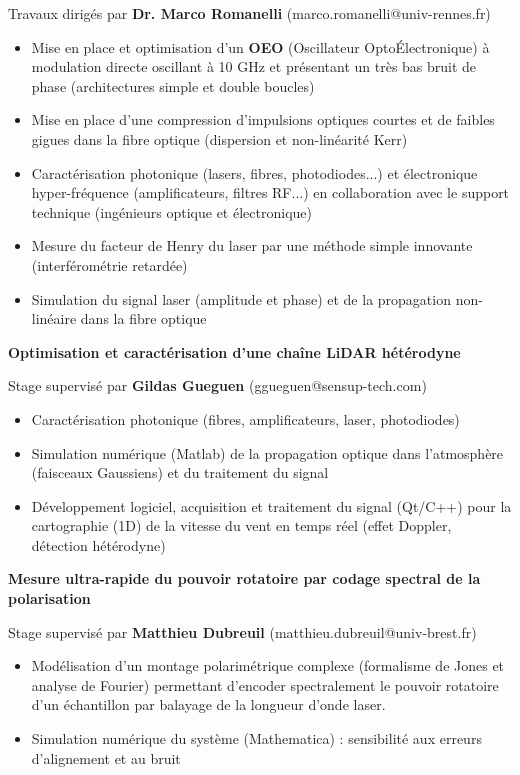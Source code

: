 \documentclass[9pt,a4paper,academicons]{altacv}
\begin{document}
Travaux dirigés par \textbf{Dr. Marco Romanelli} (marco.romanelli@univ-rennes.fr)
\smallskip
\small{
	\begin{itemize}
		\item Mise en place et optimisation d'un \textbf{OEO} (Oscillateur Opto\'Electronique) à modulation directe oscillant à 10 GHz et présentant un très bas bruit de phase (architectures simple et double boucles)
		\item Mise en place d'une compression d'impulsions optiques courtes et de faibles gigues dans la fibre optique (dispersion et non-linéarité Kerr)
		\item Caractérisation photonique (lasers, fibres, photodiodes...) et électronique hyper-fréquence (amplificateurs, filtres RF...) en collaboration avec le support technique (ingénieurs optique et électronique)
		\item Mesure du facteur de Henry du laser par une méthode simple innovante (interférométrie retardée)
		\item Simulation  du signal laser (amplitude et phase) et de la propagation non-linéaire dans la fibre optique
	\end{itemize}
}

\divider


\textbf{Optimisation et caractérisation d'une chaîne LiDAR hétérodyne}\smallskip

Stage supervisé par \textbf{Gildas Gueguen} (ggueguen@sensup-tech.com)
\smallskip
\small{
	\begin{itemize}
		\item Caractérisation photonique (fibres, amplificateurs, laser, photodiodes)
		\item Simulation numérique (Matlab) de la propagation optique dans l'atmosphère (faisceaux Gaussiens) et du traitement du signal
		\item Développement logiciel, acquisition et traitement du signal (Qt/C++) pour la cartographie (1D) de la vitesse du vent en temps réel (effet Doppler, détection hétérodyne)
	\end{itemize}
}

\divider


\textbf{Mesure ultra-rapide du pouvoir rotatoire par codage spectral de la
	polarisation}\smallskip
	
	Stage supervisé par \textbf{Matthieu Dubreuil} (matthieu.dubreuil@univ-brest.fr)
	\smallskip
\small{
	\begin{itemize}
		\item Modélisation d'un montage polarimétrique complexe (formalisme de Jones et analyse de Fourier) permettant d'encoder spectralement le pouvoir rotatoire d'un échantillon par balayage de la longueur d'onde laser.
		\item Simulation numérique du système (Mathematica) : sensibilité aux erreurs d'alignement et au bruit
	\end{itemize}
}
\end{document}
